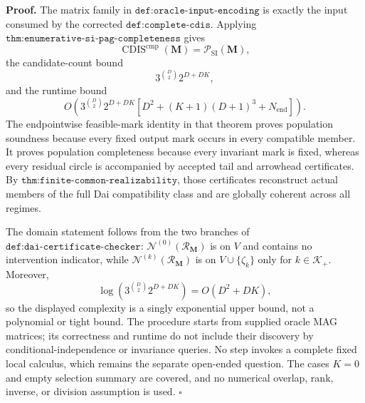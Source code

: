 \textbf{Proof.}
The matrix family in \(\texttt{def:oracle-input-encoding}\) is exactly the input consumed by the corrected \(\texttt{def:complete-cdis}\).  Applying \(\texttt{thm:enumerative-si-pag-completeness}\) gives
\[
\operatorname{CDIS}^{\mathrm{cmp}}(\mathbf M)
=\mathcal P_{\mathrm{SI}}(\mathbf M),
\]
the candidate-count bound
\[
3^{\binom D2}2^{D+DK},
\]
and the runtime bound
\[
O\!\left(
3^{\binom D2}2^{D+DK}
\left[D^2+(K+1)(D+1)^3+N_{\mathrm{end}}\right]
\right).
\]
The endpointwise feasible-mark identity in that theorem proves population soundness because every fixed output mark occurs in every compatible member.  It proves population completeness because every invariant mark is fixed, whereas every residual circle is accompanied by accepted tail and arrowhead certificates.  By \(\texttt{thm:finite-common-realizability}\), those certificates reconstruct actual members of the full Dai compatibility class and are globally coherent across all regimes.

The domain statement follows from the two branches of \(\texttt{def:dai-certificate-checker}\): \(\mathcal N^{(0)}(\mathcal R_{\mathbf M})\) is on \(V\) and contains no intervention indicator, while \(\mathcal N^{(k)}(\mathcal R_{\mathbf M})\) is on \(V\cup\{\zeta_k\}\) only for \(k\in\mathcal K_+\).  Moreover,
\[
\log\!\left(3^{\binom D2}2^{D+DK}\right)=O(D^2+DK),
\]
so the displayed complexity is a singly exponential upper bound, not a polynomial or tight bound.  The procedure starts from supplied oracle MAG matrices; its correctness and runtime do not include their discovery by conditional-independence or invariance queries.  No step invokes a complete fixed local calculus, which remains the separate open-ended question.  The cases \(K=0\) and empty selection summary are covered, and no numerical overlap, rank, inverse, or division assumption is used. \(\square\)
